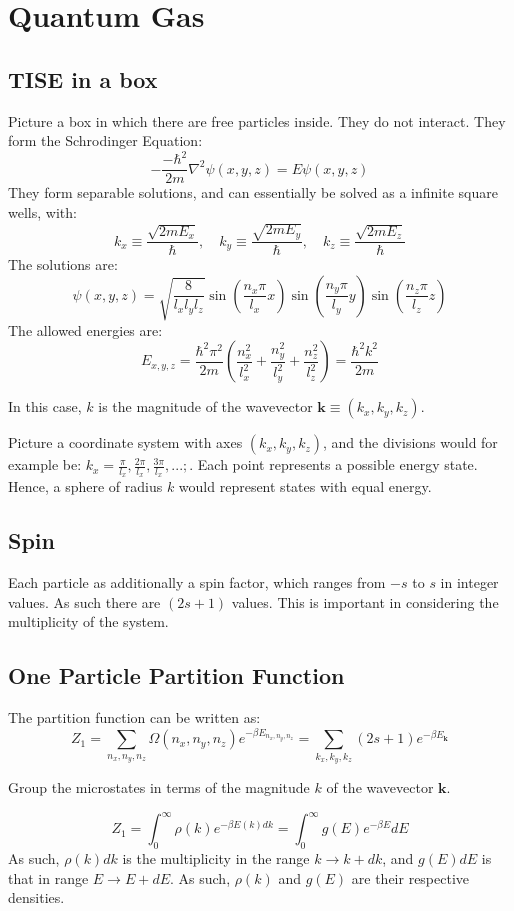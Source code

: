 \documentclass[12pt]{article}
\begin{document}
\section{Quantum Gas}

\subsection{TISE in a box}
Picture a box in which there are free particles inside. They do not interact. They form the Schrodinger Equation:
\[-\frac{-\hbar^2}{2m}\nabla^2\psi(x,y,z) = E\psi(x,y,z)\]
They form separable solutions, and can essentially be solved as a infinite square wells, with:
\[k_x \equiv \frac{\sqrt{2mE_x}}{\hbar}, \quad k_y \equiv \frac{\sqrt{2mE_y}}{\hbar}, \quad k_z \equiv \frac{\sqrt{2mE_z}}{\hbar}\]
The solutions are:
\[ \psi(x,y,z)=\sqrt{\frac{8}{l_xl_yl_z}}\sin(\frac{n_x\pi}{l_x}x)\sin(\frac{n_y\pi}{l_y}y)\sin(\frac{n_z\pi}{l_z}z)\]
The allowed energies are:
\[E_{x,y,z}=\frac{\hbar^2\pi^2}{2m}\left(\frac{n_x^2}{l_x^2}+\frac{n_y^2}{l_y^2}+\frac{n_z^2}{l_z^2}\right) = \frac{\hbar^2 k^2}{2m}\]

In this case, $k$ is the magnitude of the wavevector $\mathbf{k} \equiv (k_x, k_y, k_z)$.

Picture a coordinate system with axes $(k_x,k_y,k_z)$, and the divisions would for example be: $k_x = \frac{\pi}{l_x}, \frac{2\pi}{l_x}, \frac{3\pi}{l_x},...;$. Each point represents a possible energy state. Hence, a sphere of radius $k$ would represent states with equal energy.

\subsection{Spin}
Each particle as additionally a spin factor, which ranges from $-s$ to $s$ in integer values. As such there are $(2s+1)$ values. This is important in considering the multiplicity of the system.

\subsection{One Particle Partition Function}

The partition function can be written as:
\[Z_1 = \sum_{n_x,n_y,n_z} \Omega(n_x,n_y,n_z)e^{-\beta E_{n_x,n_y,n_z}}=\sum_{k_x,k_y,k_z} (2s+1)e^{-\beta E_\mathbf{k}}\]

Group the microstates in terms of the magnitude $k$ of the wavevector $\mathbf{k}$.

\[ Z_1 = \int^\infty_0 \rho(k) e^{-\beta E(k)dk} = \int^\infty_0 g(E) e^{-\beta E}dE\]
As such, $\rho(k)dk$ is the multiplicity in the range $k\to k+dk$, and $g(E)dE$ is that in range $E\to E+dE$. As such, $\rho(k)$ and $g(E)$ are their respective densities.
\end{document}

